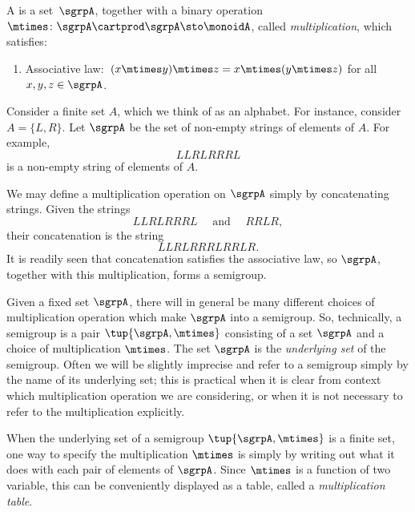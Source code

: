 
\section{}\label{sec:semigroups}


\begin{definition}[Semigroup]
  \label{def:semigroup}
  A \emph{} is a set~$\sgrpA$, together with a binary operation~$\mtimes \colon \sgrpA \cartprod \sgrpA \sto \monoidA$, called \emph{multiplication}, which satisfies:
  \begin{enumerate}
    \item Associative law:~$(x\mtimes y)\mtimes z=x\mtimes (y\mtimes z)$ for all $x , y, z \in \sgrpA$.
  \end{enumerate}
\end{definition}

\begin{example}\label{string-semigroup}
Consider a finite set $A$, which we think of as an alphabet. For instance, consider $A = \{ L, R \}$.
Let $\sgrpA$ be the set of non-empty strings of elements of $A$. For example,
$$ LLRLRRRL $$
is a non-empty string of elements of $A$.

We may define a multiplication operation on $\sgrpA$ simply by concatenating strings. Given the strings
$$ LLRLRRRL  \quad \text{ and } \quad RRLR, $$
their concatenation is the string
$$ LLRLRRRLRRLR.$$
It is readily seen that concatenation satisfies the associative law, so $\sgrpA$, together with this multiplication, forms a semigroup.
\end{example}

\begin{remark}
Given a fixed set $\sgrpA$, there will in general be many different choices of multiplication operation which make $\sgrpA$ into a semigroup. So, technically, a semigroup is a pair $\tup{\sgrpA, \mtimes}$ consisting of a set $\sgrpA$ and a choice of multiplication $\mtimes$. The set $\sgrpA$ is the \emph{underlying set} of the semigroup. Often we will be slightly imprecise and refer to a semigroup simply by the name of its underlying set; this is practical when it is clear from context which multiplication operation we are considering, or when it is not necessary to refer to the multiplication explicitly.
\end{remark}

When the underlying set of a semigroup $\tup{\sgrpA, \mtimes}$ is a finite set, one way to specify the multiplication $\mtimes$ is simply by writing out what it does with each pair of elements of $\sgrpA$. Since $\mtimes$ is a function of two variable, this can be conveniently displayed as a table, called a \emph{multiplication table}.

